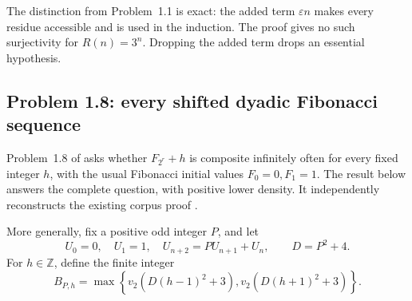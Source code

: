 \documentclass[11pt,a4paper]{article}
\numberwithin{equation}{section}
\theoremstyle{definition}
\theoremstyle{remark}
\begin{document}
The distinction from Problem~1.1 is exact: the added term
\(\varepsilon n\) makes every residue accessible and is used
in the induction. The proof gives no such surjectivity
for \(R(n)=3^n\). Dropping the added term drops an essential
hypothesis.

\subsection{Problem 1.8: every shifted dyadic Fibonacci sequence}
\label{exm:fibonacci}

Problem~1.8 of \cite{SaitoIntervals} asks whether
\(F_{2^r}+h\) is composite infinitely often for every fixed
integer \(h\), with the usual Fibonacci initial values
\(F_0=0,F_1=1\). The result below answers the complete
question, with positive lower density. It independently
reconstructs the existing corpus proof \cite{VMRC007}.

More generally, fix a positive odd integer \(P\), and let
\[
 U_0=0,\quad U_1=1,\quad U_{n+2}=PU_{n+1}+U_n,\qquad
 D=P^2+4.
\]
For \(h\in\mathbb Z\), define the finite integer
\begin{equation}\label{exm:threshold}
 B_{P,h}=\max\left\{
 v_2\!\left(D(h-1)^2+3\right),
 v_2\!\left(D(h+1)^2+3\right)\right\}.
\end{equation}
\end{document}
